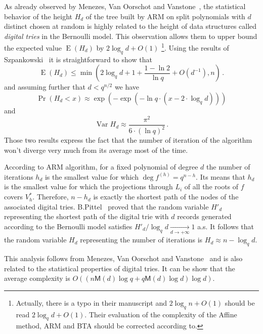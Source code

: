 \documentclass{sig-alternate}
\newcommand{\dd}{d}
\newcommand{\qq}{q}
\newcommand{\nn}{n}
\DeclareMathOperator{\Var}{Var}
\DeclareMathOperator{\Exp}{E}
\newcommand{\bigO}{O}
\newcommand{\Mul}{\mathsf{M}}
\newcounter{algo}
\begin{document}
 As already observed by Menezes, Van Oorschot and Vanstone~\cite{Menvanovans92}, 
the statistical behavior of the height $H_{\dd}$ of the tree built by ARM on split polynomials with $\dd$ distinct chosen at random is highly 
related to the height of data structures called \emph{digital tries} in the Bernoulli model. This observation allows them to upper bound the expected value $\Exp(H_{\dd})$ by $2\log_q \dd + \bigO(1)$
\footnote{Actually, there is a typo in their manuscript and $ 2\log_q \nn + \bigO(1)$ should be read $2\log_q \dd + \bigO(1)$. Their evaluation of the complexity of the Affine method, ARM and BTA should be corrected according to.}.
 Using the results of Szpankowski~\cite{szpankowski1986analysis} it is straightforward to show that 
   $$\Exp(H _\dd) \le  \min(2 \log_\qq \dd +1 +\frac{1-\ln 2}{\ln \qq} + \bigO(\dd^{-1}), \nn)\,.$$
and assuming further that $\dd < \qq^{n/2}$ we have
 $$\Pr(H_\dd <x) \approx \exp(-\exp(-\ln \qq \cdot (x-2 \cdot \log_\qq \dd)))$$ 
 and 
 $$\Var H_\dd \approx \frac{\pi^2}{6 \cdot (\ln \qq)^2} \,.$$
Those two results express the fact that the number of iteration of the algorithm won't diverge very much from its average most of the time.

\medskip



 According to ARM algorithm, for a fixed polynomial of degree $\dd$ the number of iterations $h_d$ is the smallest value for which $\deg f^{(h)}=\qq^{n-h}$. Its means that $h_d$ is the 
  smallest value for which the projections through $L_i$ of all the roots of $f$ covers $V_h^\ast$. Therefore, $n-h_d$ is exactly the shortest
   path of the nodes of the associated digital tries. B.Pittel~\cite{Pittel86} proved that the random variable $H'_d$ representing the shortest path of the digital trie with $d$ records generated according to the Bernoulli model satisfies
 $H'_d/\log_{q} d \underset{d \to +\infty}{\longrightarrow} 1$ a.s. It follows that the random variable $H_d$ representing the number of iterations is $H_d \approx n-\log_{q} d$.

\medskip

 This analysis follows from Menezes, Van Oorschot and Vanstone~\cite{Menvanovans92} and is also related to the statistical properties of digital tries. It can be show that the average complexity is $\bigO((\nn\Mul(d)\log\qq+\qq\Mul(d)\log\dd) \log\dd)$.
\end{document}
